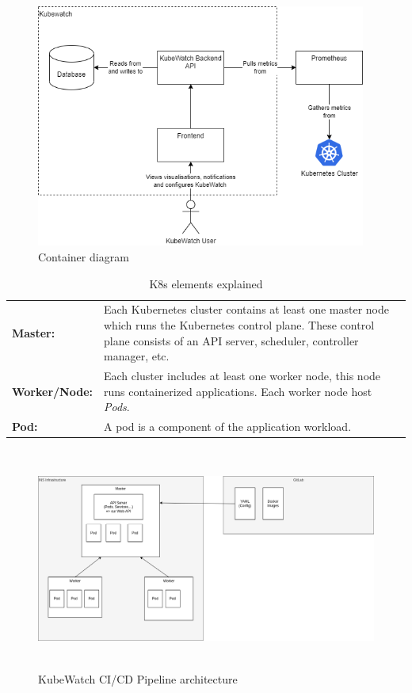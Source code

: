 \begin{figure}[H]
  \centering
  \includegraphics[height=8cm]{resources/Container_diagram.png}
  \caption{Container diagram}
  \label{fig:container-diagram}
\end{figure}

\begin{table}[H]
  \begin{tabular*}{\textwidth}{p{3.5cm} | p{9cm}}
    \textbf{Master:}
      & Each Kubernetes cluster contains at least one master node which runs the Kubernetes control plane. These control plane consists of an API server, scheduler, controller manager, etc. \bigskip \\
    \textbf{Worker/Node:}
      & Each cluster includes at least one worker node, this node runs containerized applications. Each worker node host \textit{Pods}. \bigskip \\
    \textbf{Pod:}
      & A pod is a component of the application workload. \\
  \end{tabular*}
  \caption{K8s elements explained}
  \label{tab:k8s-elements-explained}
\end{table}

\begin{figure}[H]
  \centering
  \includegraphics[height=7.3cm]{resources/architecture.png}
  \caption{KubeWatch CI/CD Pipeline architecture}
  \label{fig:architecture}
\end{figure}

